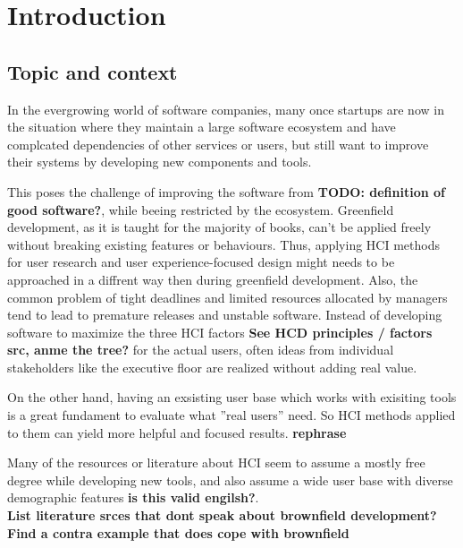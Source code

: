 %
\chapter{Introduction}
\label{chap:introduction}

\section{Topic and context}

In the evergrowing world of software companies, many once startups are now in the situation where they maintain a large software ecosystem and have complcated dependencies of other services or users,
but still want to improve their systems by developing new components and tools.

This poses the challenge of improving the software from \textbf{TODO: definition of good software?}, while beeing restricted by the ecosystem.
Greenfield development, as it is taught for the majority of books, can't be applied freely without breaking existing features or behaviours.
Thus, applying HCI methods for user research and user experience-focused design might needs to be approached in a diffrent way then during greenfield development.
Also, the common problem of tight deadlines and limited resources allocated by managers tend to lead to premature releases and unstable software.
Instead of developing software to maximize the three HCI factors \textbf{See HCD principles / factors src, anme the tree?} for the actual users, often ideas from individual stakeholders like the executive floor are realized without adding real value.

On the other hand, having an exsisting user base which works with exisiting tools is a great fundament to evaluate what ''real users'' need. So HCI methods applied to them can yield more helpful and focused results. \textbf{rephrase}

Many of the resources or literature about HCI seem to assume a mostly free degree while developing new tools, and also assume a wide user base with diverse demographic features \textbf{is this valid engilsh?}.
\\
\textbf{List literature srces that dont speak about brownfield development?}
\textbf{Find a contra example that does cope with brownfield}
	

